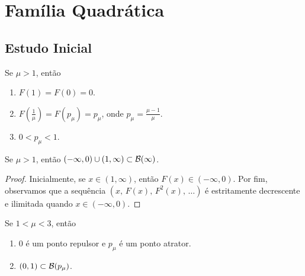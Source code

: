 \section{Família Quadrática}

\subsection{Estudo Inicial}
\begin{proposition}
Se $\mu > 1$, então
\begin{enumerate}
\item $F(1) = F(0) = 0$.
\item $F(\frac{1}{\mu}) = F(p_\mu) = p_\mu$, onde $p_\mu = \frac{\mu-1}{\mu}$.
\item $0 < p_\mu < 1$.
\end{enumerate}
\end{proposition}

\begin{proposition} \label{prop 2-1}
Se $\mu > 1$, então $(-\infty, 0) \cup (1, \infty) \subset \mathcal{B}(\infty)$.
\end{proposition}

\begin{proof}
Inicialmente, se $x \in (1, \infty)$, então $F(x) \in (-\infty, 0)$. Por fim, observamos que a sequência  $(x,\, F(x),\, F^2(x),\, \dots)$ é estritamente decrescente e ilimitada quando $x \in (-\infty, 0)$.
\newline
\end{proof}

\begin{proposition}
Se $1 < \mu < 3$, então
\begin{enumerate}
\item $0$ é um ponto repulsor e $p_\mu$ é um ponto atrator.
\item $(0, 1) \subset \mathcal{B}(p_\mu)$.
\end{enumerate}
\end{proposition}
